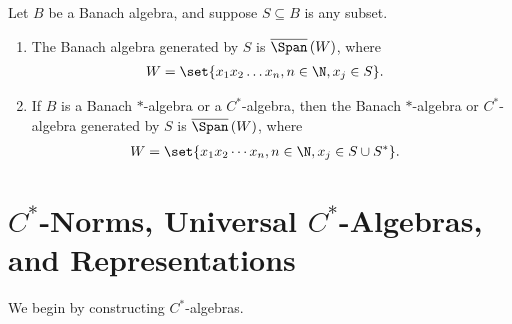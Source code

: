\begin{lemma}
  Let $B$ be a Banach algebra, and suppose $S\subseteq B$ is any subset.
  \begin{enumerate}[(1)]
    \item The Banach algebra generated by $S$ is $\overline{\Span}\left( W \right)$, where
      \begin{align*}
        W &= \set{x_1x_2\dots x_n,n\in\N,x_j\in S}.
      \end{align*}
    \item If $B$ is a Banach $\ast$-algebra or a $C^{\ast}$-algebra, then the Banach $\ast$-algebra or $C^{\ast}$-algebra generated by $S$ is $\overline{\Span}\left( W \right)$, where
      \begin{align*}
        W &= \set{x_1x_2\cdots x_n, n\in\N,x_j\in S\cup S^{\ast}}.
      \end{align*}
  \end{enumerate}
\end{lemma}

\section{\texorpdfstring{$C^{\ast}$-Norms}{C*-Norms}, Universal \texorpdfstring{$C^{\ast}$-Algebras}{C*-Algebras}, and Representations}%
We begin by constructing $C^{\ast}$-algebras.\newline

